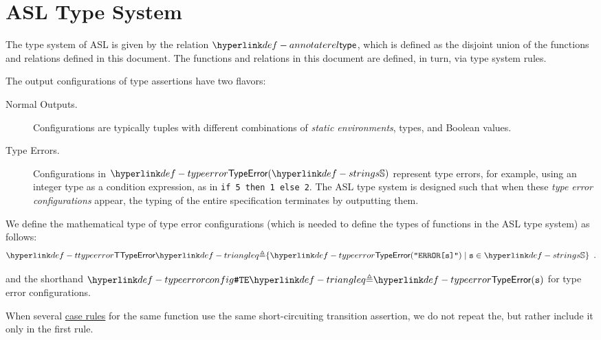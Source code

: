
\section{ASL Type System}
\hypertarget{def-annotaterel}{}
The type system of ASL is given by the relation $\annotaterel$, which is defined as the disjoint union
of the functions and relations defined in this document.
The functions and relations in this document are defined, in turn, via type system rules.

The output configurations of type assertions have two flavors:
\begin{description}
  \item[Normal Outputs.] \hypertarget{def-normal-type-outputs}{}
  Configurations are typically tuples with different combinations
  of \emph{static environments}, types, and Boolean values.

  \hypertarget{def-typeerror}{}
  \item[Type Errors.] Configurations in $\TypeError(\Strings)$
  represent type errors, for example, using an integer type as a condition expression, as in \verb|if 5 then 1 else 2|.
  The ASL type system is designed such that when these \emph{type error configurations} appear,
  the typing of the entire specification terminates by outputting them.
\end{description}

We define the mathematical type of type error configurations
(which is needed to define the types of functions in the ASL type system)
as follows:
\hypertarget{def-ttypeerror}{}
\[
  \TTypeError \triangleq \{\TypeErrorVal{\vs} \;|\; \vs \in \Strings \} \enspace.
\]

\hypertarget{def-typeerrorconfig}{}
and the shorthand $\TypeErrorConfig \triangleq \TypeError(\vs)$ for type error configurations.

%
When several \hyperlink{def-caserules}{case rules} for the same function use the same short-circuiting transition assertion,
we do not repeat the\ProseOrTypeError, but rather include it only in the first rule.


